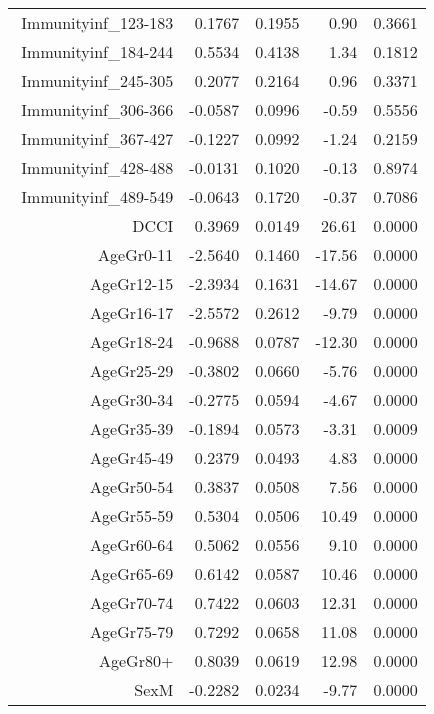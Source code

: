 \begin{table}[ht]
\begin{tabular}{rrrrr}
$$  Immunityinf\_123-183 & 0.1767 & 0.1955 & 0.90 & 0.3661 \\ 
  Immunityinf\_184-244 & 0.5534 & 0.4138 & 1.34 & 0.1812 \\ 
  Immunityinf\_245-305 & 0.2077 & 0.2164 & 0.96 & 0.3371 \\ 
  Immunityinf\_306-366 & -0.0587 & 0.0996 & -0.59 & 0.5556 \\ 
  Immunityinf\_367-427 & -0.1227 & 0.0992 & -1.24 & 0.2159 \\ 
  Immunityinf\_428-488 & -0.0131 & 0.1020 & -0.13 & 0.8974 \\ 
  Immunityinf\_489-549 & -0.0643 & 0.1720 & -0.37 & 0.7086 \\ 
  DCCI & 0.3969 & 0.0149 & 26.61 & 0.0000 \\ 
  AgeGr0-11 & -2.5640 & 0.1460 & -17.56 & 0.0000 \\ 
  AgeGr12-15 & -2.3934 & 0.1631 & -14.67 & 0.0000 \\ 
  AgeGr16-17 & -2.5572 & 0.2612 & -9.79 & 0.0000 \\ 
  AgeGr18-24 & -0.9688 & 0.0787 & -12.30 & 0.0000 \\ 
  AgeGr25-29 & -0.3802 & 0.0660 & -5.76 & 0.0000 \\ 
  AgeGr30-34 & -0.2775 & 0.0594 & -4.67 & 0.0000 \\ 
  AgeGr35-39 & -0.1894 & 0.0573 & -3.31 & 0.0009 \\ 
  AgeGr45-49 & 0.2379 & 0.0493 & 4.83 & 0.0000 \\ 
  AgeGr50-54 & 0.3837 & 0.0508 & 7.56 & 0.0000 \\ 
  AgeGr55-59 & 0.5304 & 0.0506 & 10.49 & 0.0000 \\ 
  AgeGr60-64 & 0.5062 & 0.0556 & 9.10 & 0.0000 \\ 
  AgeGr65-69 & 0.6142 & 0.0587 & 10.46 & 0.0000 \\ 
  AgeGr70-74 & 0.7422 & 0.0603 & 12.31 & 0.0000 \\ 
  AgeGr75-79 & 0.7292 & 0.0658 & 11.08 & 0.0000 \\ 
  AgeGr80+ & 0.8039 & 0.0619 & 12.98 & 0.0000 \\ 
  SexM & -0.2282 & 0.0234 & -9.77 & 0.0000 \\ 
   \hline
\end{tabular}
\end{table}
